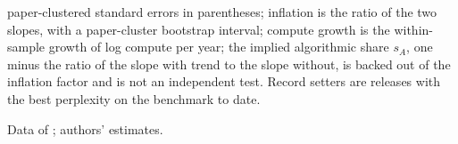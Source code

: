 \begin{table}[tp]
\begin{tablenotes}
paper-clustered standard errors in parentheses; inflation is the ratio of the two slopes, with a paper-cluster
bootstrap interval; compute growth is the within-sample growth of log compute per year; the implied algorithmic share
$s_A$, one minus the ratio of the slope with trend to the slope without, is backed out of the inflation factor and is not an
independent test. Record setters are releases with the best perplexity on the benchmark to date.\end{tablenotes}
\begin{tablenotes}[Source]Data of \citet{ho2024algorithmic}; authors' estimates.\end{tablenotes}
\end{table}

